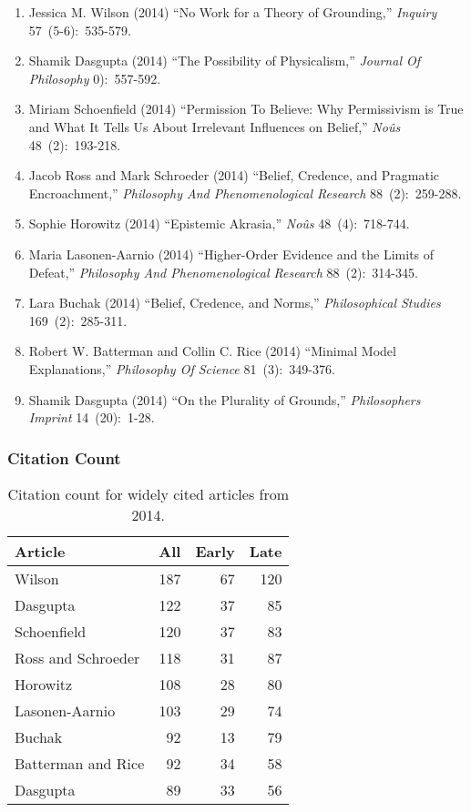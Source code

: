 \documentclass[
  10pt,
  letterpaper,
  DIV=11,
  numbers=noendperiod,
  twoside]{scrartcl}
\providecommand{\tightlist}{%
  \setlength{\itemsep}{0pt}\setlength{\parskip}{0pt}}\usepackage{longtable,booktabs,array}
\begin{document}
\begin{enumerate}
\def\labelenumi{\arabic{enumi}.}
\tightlist
\item
  Jessica M. Wilson (2014) ``No Work for a Theory of Grounding,''
  \emph{Inquiry} 57~(5-6):~535-579.
\item
  Shamik Dasgupta (2014) ``The Possibility of Physicalism,''
  \emph{Journal Of Philosophy} 0):~557-592.
\item
  Miriam Schoenfield (2014) ``Permission To Believe: Why Permissivism is
  True and What It Tells Us About Irrelevant Influences on Belief,''
  \emph{Noûs} 48~(2):~193-218.
\item
  Jacob Ross and Mark Schroeder (2014) ``Belief, Credence, and Pragmatic
  Encroachment,'' \emph{Philosophy And Phenomenological Research}
  88~(2):~259-288.
\item
  Sophie Horowitz (2014) ``Epistemic Akrasia,'' \emph{Noûs}
  48~(4):~718-744.
\item
  Maria Lasonen-Aarnio (2014) ``Higher-Order Evidence and the Limits of
  Defeat,'' \emph{Philosophy And Phenomenological Research}
  88~(2):~314-345.
\item
  Lara Buchak (2014) ``Belief, Credence, and Norms,''
  \emph{Philosophical Studies} 169~(2):~285-311.
\item
  Robert W. Batterman and Collin C. Rice (2014) ``Minimal Model
  Explanations,'' \emph{Philosophy Of Science} 81~(3):~349-376.
\item
  Shamik Dasgupta (2014) ``On the Plurality of Grounds,''
  \emph{Philosophers Imprint} 14~(20):~1-28.
\end{enumerate}

\subsubsection*{Citation Count}\label{sec-count-2014}

\begin{longtable}[]{@{}lrrr@{}}

\caption{\label{tbl-citation-count-2014}Citation count for widely cited
articles from 2014.}

\tabularnewline

\toprule\noalign{}
Article & All & Early & Late \\
\midrule\noalign{}
\endhead
\bottomrule\noalign{}
\endlastfoot
Wilson & 187 & 67 & 120 \\
Dasgupta & 122 & 37 & 85 \\
Schoenfield & 120 & 37 & 83 \\
Ross and Schroeder & 118 & 31 & 87 \\
Horowitz & 108 & 28 & 80 \\
Lasonen-Aarnio & 103 & 29 & 74 \\
Buchak & 92 & 13 & 79 \\
Batterman and Rice & 92 & 34 & 58 \\
Dasgupta & 89 & 33 & 56 \\

\end{longtable}
\end{document}
